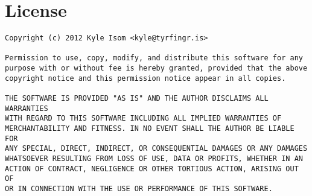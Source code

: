 \documentclass[10pt,letterpaper]{article}
\begin{document}
\section*{License}
\begin{verbatim}
Copyright (c) 2012 Kyle Isom <kyle@tyrfingr.is>

Permission to use, copy, modify, and distribute this software for any
purpose with or without fee is hereby granted, provided that the above 
copyright notice and this permission notice appear in all copies.

THE SOFTWARE IS PROVIDED "AS IS" AND THE AUTHOR DISCLAIMS ALL WARRANTIES
WITH REGARD TO THIS SOFTWARE INCLUDING ALL IMPLIED WARRANTIES OF
MERCHANTABILITY AND FITNESS. IN NO EVENT SHALL THE AUTHOR BE LIABLE FOR
ANY SPECIAL, DIRECT, INDIRECT, OR CONSEQUENTIAL DAMAGES OR ANY DAMAGES
WHATSOEVER RESULTING FROM LOSS OF USE, DATA OR PROFITS, WHETHER IN AN
ACTION OF CONTRACT, NEGLIGENCE OR OTHER TORTIOUS ACTION, ARISING OUT OF
OR IN CONNECTION WITH THE USE OR PERFORMANCE OF THIS SOFTWARE. 
\end{verbatim}
\end{document}
